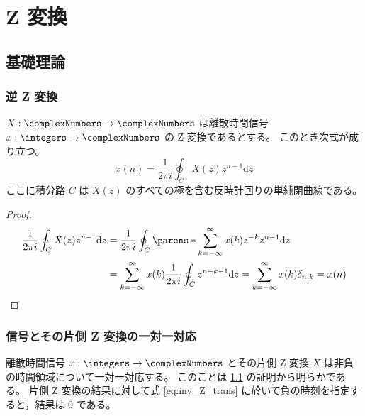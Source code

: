 \part{Z 変換}
	\chapter{基礎理論}
		\section{逆 Z 変換}
			\label{inv_Z_trans}
			\begin{shadebox}
				$X:\complexNumbers\to\complexNumbers$ は離散時間信号 $x:\integers\to\complexNumbers$ の Z 変換であるとする。
				このとき次式が成り立つ。
				\begin{equation}
					\label{eq:inv_Z_trans}
					x(n) = \frac{1}{2\pi i}\oint_C X(z)z^{n-1}\mathrm{d}z
				\end{equation}
				ここに積分路 $C$ は $X(z)$ のすべての極を含む反時計回りの単純閉曲線である。
			\end{shadebox}
			\begin{proof}
				\begin{align*}
					\frac{1}{2\pi i}\oint_C X(z)z^{n-1}\mathrm{d}z &= \frac{1}{2\pi i}\oint_C \parens*{\sum_{k=-\infty}^\infty x(k)z^{-k}}z^{n-1}\mathrm{d}z \\
					&= \sum_{k=-\infty}^\infty x(k)\frac{1}{2\pi i}\oint_C z^{n-k-1}\mathrm{d}z = \sum_{k=-\infty}^\infty x(k)\delta_{n,k} = x(n)
				\end{align*}
			\end{proof}
		\section{信号とその片側 Z 変換の一対一対応}
			離散時間信号 $x:\integers\to\complexNumbers$ とその片側 Z 変換 $X$ は非負の時間領域について一対一対応する。
			このことは \ref{inv_Z_trans} の証明から明らかである。
			片側 Z 変換の結果に対して式 \eqref{eq:inv_Z_trans} に於いて負の時刻を指定すると，結果は 0 である。
